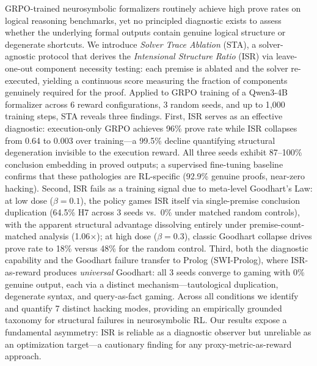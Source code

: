 GRPO-trained neurosymbolic formalizers routinely achieve high prove rates on logical reasoning benchmarks, yet no principled diagnostic exists to assess whether the underlying formal outputs contain genuine logical structure or degenerate shortcuts.
We introduce \emph{Solver Trace Ablation} (STA), a solver-agnostic protocol that derives the \emph{Intensional Structure Ratio} (ISR) via leave-one-out component necessity testing: each premise is ablated and the solver re-executed, yielding a continuous score measuring the fraction of components genuinely required for the proof.
Applied to GRPO training of a Qwen3-4B formalizer across 6 reward configurations, 3 random seeds, and up to 1{,}000 training steps, STA reveals three findings.
First, ISR serves as an effective diagnostic: execution-only GRPO achieves 96\% prove rate while ISR collapses from 0.64 to 0.003 over training---a 99.5\% decline quantifying structural degeneration invisible to the execution reward.
All three seeds exhibit 87--100\% conclusion embedding in proved outputs; a supervised fine-tuning baseline confirms that these pathologies are RL-specific (92.9\% genuine proofs, near-zero hacking).
Second, ISR fails as a training signal due to meta-level Goodhart's Law: at low dose ($\beta{=}0.1$), the policy games ISR itself via single-premise conclusion duplication (64.5\% H7 across 3 seeds vs.\ 0\% under matched random controls), with the apparent structural advantage dissolving entirely under premise-count-matched analysis (1.06$\times$); at high dose ($\beta{=}0.3$), classic Goodhart collapse drives prove rate to 18\% versus 48\% for the random control.
Third, both the diagnostic capability and the Goodhart failure transfer to Prolog (SWI-Prolog), where ISR-as-reward produces \emph{universal} Goodhart: all 3 seeds converge to gaming with 0\% genuine output, each via a distinct mechanism---tautological duplication, degenerate syntax, and query-as-fact gaming.
Across all conditions we identify and quantify 7 distinct hacking modes, providing an empirically grounded taxonomy for structural failures in neurosymbolic RL.
Our results expose a fundamental asymmetry: ISR is reliable as a diagnostic observer but unreliable as an optimization target---a cautionary finding for any proxy-metric-as-reward approach.

